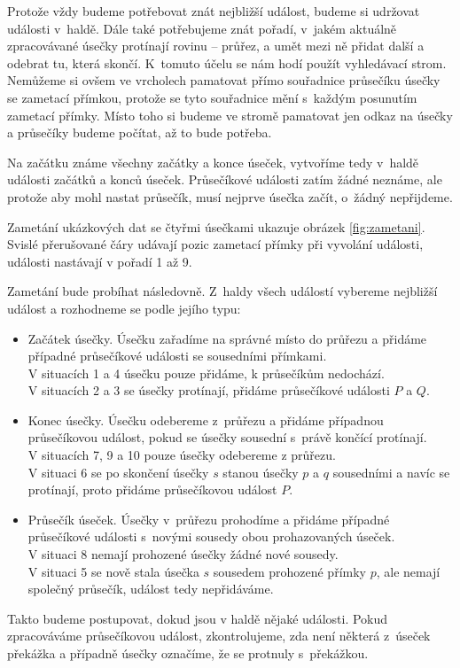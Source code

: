 Protože vždy budeme potřebovat znát nejbližší událost, budeme si udržovat
události v~haldě. Dále také potřebujeme znát pořadí, v~jakém aktuálně
zpracovávané úsečky protínají rovinu -- průřez, a umět mezi ně přidat další a
odebrat tu, která skončí. K~tomuto účelu se nám hodí použít vyhledávací strom.
Nemůžeme si ovšem ve vrcholech pamatovat přímo souřadnice průsečíku úsečky se
zametací přímkou, protože se tyto souřadnice mění s~každým posunutím zametací
přímky. Místo toho si budeme ve stromě pamatovat jen odkaz na úsečky a průsečíky
budeme počítat, až to bude potřeba.

Na začátku známe všechny začátky a konce úseček, vytvoříme tedy v~haldě události
začátků a konců úseček. Průsečíkové události zatím žádné neznáme, ale protože
aby mohl nastat průsečík, musí nejprve úsečka začít, o~žádný nepřijdeme.

Zametání ukázkových dat se čtyřmi úsečkami ukazuje obrázek \ref{fig:zametani}.
Svislé přerušované čáry udávají pozic zametací přímky při vyvolání události,
události nastávají v pořadí 1 až 9.

Zametání bude probíhat následovně. Z~haldy všech událostí vybereme nejbližší
událost a rozhodneme se podle jejího typu:
\begin{itemize}
	\item {\tuc Začátek úsečky.}  Úsečku zařadíme na správné místo do
	průřezu a přidáme případné průsečíkové události se sousedními
	přímkami.\\
	V situacích 1 a 4 úsečku pouze přidáme, k průsečíkům nedochází.\\
	V situacích 2 a 3 se úsečky protínají, přidáme průsečíkové události
	$P$ a $Q$.

	\item {\tuc Konec úsečky.} Úsečku odebereme z~průřezu a přidáme
	případnou průsečíkovou událost, pokud se úsečky sousední s~právě
	končící protínají.\\
	V situacích 7, 9 a 10 pouze úsečky odebereme z průřezu.\\
	V situaci 6 se po skončení úsečky $s$ stanou úsečky $p$ a $q$ sousedními
	a navíc se protínají, proto přidáme průsečíkovou událost $P$.
	\item {\tuc Průsečík úseček.} Úsečky v~průřezu prohodíme a přidáme
	případné průsečíkové události s~novými sousedy obou prohazovaných 
	úseček.\\
	V situaci 8 nemají prohozené úsečky žádné nové sousedy.\\
	V situaci 5 se nově stala úsečka $s$ sousedem prohozené přímky $p$, ale
	nemají společný průsečík, událost tedy nepřidáváme.
\end{itemize}
Takto budeme postupovat, dokud jsou v haldě nějaké události. Pokud zpracováváme 
průsečíkovou událost, zkontrolujeme, zda není některá z~úseček překážka a 
případně úsečky označíme, že se protnuly s~překážkou. 


